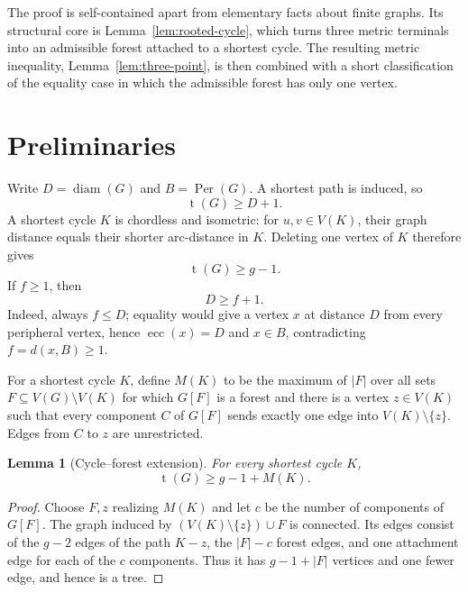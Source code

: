 \documentclass[11pt]{article}
\numberwithin{equation}{section}
\newtheorem{lemma}[theorem]{Lemma}
\theoremstyle{remark}
\newcommand{\tr}{\operatorname{t}}
\newcommand{\diam}{\operatorname{diam}}
\newcommand{\ecc}{\operatorname{ecc}}
\newcommand{\Per}{\operatorname{Per}}
\begin{document}
The proof is self-contained apart from elementary facts about finite graphs.
Its structural core is Lemma~\ref{lem:rooted-cycle}, which turns three metric
terminals into an admissible forest attached to a shortest cycle.  The
resulting metric inequality, Lemma~\ref{lem:three-point}, is then combined
with a short classification of the equality case in which the admissible
forest has only one vertex.

\section{Preliminaries}

Write $D=\diam(G)$ and $B=\Per(G)$.  A shortest path is induced, so
\begin{equation}\label{eq:diam-path}
  \tr(G)\ge D+1.
\end{equation}
A shortest cycle $K$ is chordless and isometric: for $u,v\in V(K)$, their
graph distance equals their shorter arc-distance in $K$.  Deleting one
vertex of $K$ therefore gives
\begin{equation}\label{eq:cycle-base}
  \tr(G)\ge g-1.
\end{equation}
If $f\ge1$, then
\begin{equation}\label{eq:D-f}
  D\ge f+1.
\end{equation}
Indeed, always $f\le D$; equality would give a vertex $x$ at distance $D$
from every peripheral vertex, hence $\ecc(x)=D$ and $x\in B$, contradicting
$f=d(x,B)\ge1$.

For a shortest cycle $K$, define $M(K)$ to be the maximum of $|F|$ over all
sets $F\subseteq V(G)\setminus V(K)$ for which $G[F]$ is a forest and there
is a vertex $z\in V(K)$ such that every component $C$ of $G[F]$ sends
exactly one edge into $V(K)\setminus\{z\}$.  Edges from $C$ to $z$ are
unrestricted.

\begin{lemma}[Cycle--forest extension]\label{lem:cycle-forest}
For every shortest cycle $K$,
\[
  \tr(G)\ge g-1+M(K).
\]
\end{lemma}

\begin{proof}
Choose $F,z$ realizing $M(K)$ and let $c$ be the number of components of
$G[F]$.  The graph induced by
$(V(K)\setminus\{z\})\cup F$ is connected.  Its edges consist of the $g-2$
edges of the path $K-z$, the $|F|-c$ forest edges, and one attachment edge
for each of the $c$ components.  Thus it has $g-1+|F|$ vertices and one
fewer edge, and hence is a tree.
\end{proof}
\end{document}
